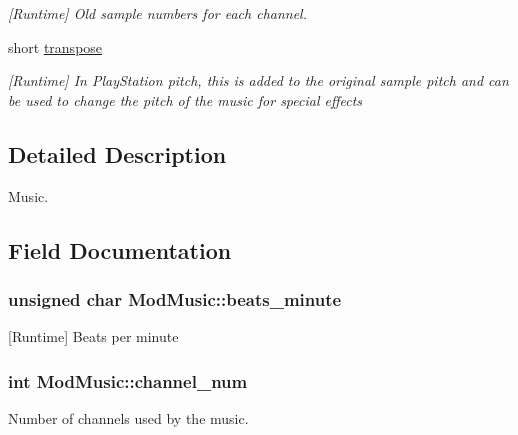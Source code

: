 \begin{DoxyCompactItemize}
\begin{DoxyCompactList}\small\item\em \mbox{[}Runtime\mbox{]} Old sample numbers for each channel. \end{DoxyCompactList}\item 
short \hyperlink{structModMusic_a08eaea3acf218f237d5cfcb05870d7fc}{transpose}
\begin{DoxyCompactList}\small\item\em \mbox{[}Runtime\mbox{]} In Play\+Station pitch, this is added to the original sample pitch and can be used to change the pitch of the music for special effects \end{DoxyCompactList}\end{DoxyCompactItemize}


\subsection{Detailed Description}
Music. 

\subsection{Field Documentation}
\hypertarget{structModMusic_a69d46bccf5dd49685b43830ee03fbc3d}{}
\subsubsection[{beats\+\_\+minute}]{\setlength{\rightskip}{0pt plus 5cm}unsigned char Mod\+Music\+::beats\+\_\+minute}\label{structModMusic_a69d46bccf5dd49685b43830ee03fbc3d}


\mbox{[}Runtime\mbox{]} Beats per minute 

\hypertarget{structModMusic_ae0ae287338ab6864050297cdf8fb9732}{}
\subsubsection[{channel\+\_\+num}]{\setlength{\rightskip}{0pt plus 5cm}int Mod\+Music\+::channel\+\_\+num}\label{structModMusic_ae0ae287338ab6864050297cdf8fb9732}


Number of channels used by the music. 

\hypertarget{structModMusic_a34dae5fc4930940b0cda5fd44467c751}{}

